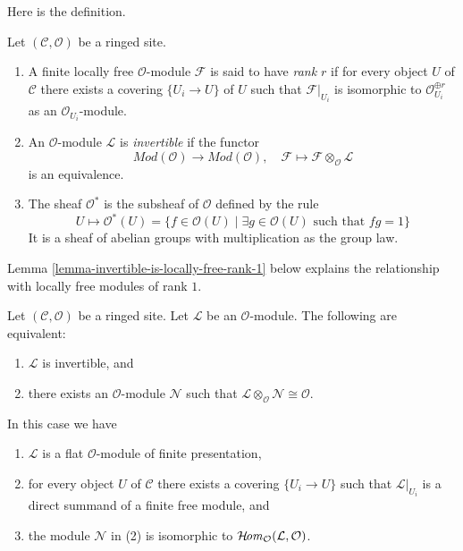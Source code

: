 \noindent
Here is the definition.

\begin{definition}
\label{definition-invertible-sheaf}
Let $(\mathcal{C}, \mathcal{O})$ be a ringed site.
\begin{enumerate}
\item A finite locally free $\mathcal{O}$-module $\mathcal{F}$ is said
to have {\it rank $r$} if for every object $U$ of $\mathcal{C}$ there
exists a covering $\{U_i \to U\}$ of $U$ such that $\mathcal{F}|_{U_i}$
is isomorphic to $\mathcal{O}_{U_i}^{\oplus r}$ as an
$\mathcal{O}_{U_i}$-module.
\item An $\mathcal{O}$-module $\mathcal{L}$ is {\it invertible}
if the functor
$$
\textit{Mod}(\mathcal{O}) \longrightarrow \textit{Mod}(\mathcal{O}),\quad
\mathcal{F}  \longmapsto \mathcal{F} \otimes_\mathcal{O} \mathcal{L}
$$
is an equivalence.
\item The sheaf {\it $\mathcal{O}^*$} is the subsheaf of
$\mathcal{O}$ defined by the rule
$$
U \longmapsto \mathcal{O}^*(U) = \{f \in \mathcal{O}(U) \mid
\exists g \in \mathcal{O}(U)\text{ such that }fg = 1\}
$$
It is a sheaf of abelian groups with multiplication as the group law.
\end{enumerate}
\end{definition}

\noindent
Lemma \ref{lemma-invertible-is-locally-free-rank-1}
below explains the relationship with locally free modules
of rank $1$.

\begin{lemma}
\label{lemma-invertible}
Let $(\mathcal{C}, \mathcal{O})$ be a ringed site. Let $\mathcal{L}$
be an $\mathcal{O}$-module. The following are equivalent:
\begin{enumerate}
\item $\mathcal{L}$ is invertible, and
\item there exists an $\mathcal{O}$-module $\mathcal{N}$
such that
$\mathcal{L} \otimes_\mathcal{O} \mathcal{N} \cong \mathcal{O}$.
\end{enumerate}
In this case we have
\begin{enumerate}
\item[(a)] $\mathcal{L}$ is a flat $\mathcal{O}$-module of finite presentation,
\item[(b)] for every object $U$ of $\mathcal{C}$ there exists a
covering $\{U_i \to U\}$ such that $\mathcal{L}|_{U_i}$
is a direct summand of a finite free module, and
\item[(c)] the module $\mathcal{N}$ in (2) is isomorphic to
$\mathop{\mathcal{H}\!\mathit{om}}\nolimits_\mathcal{O}(\mathcal{L}, \mathcal{O})$.
\end{enumerate}
\end{lemma}

